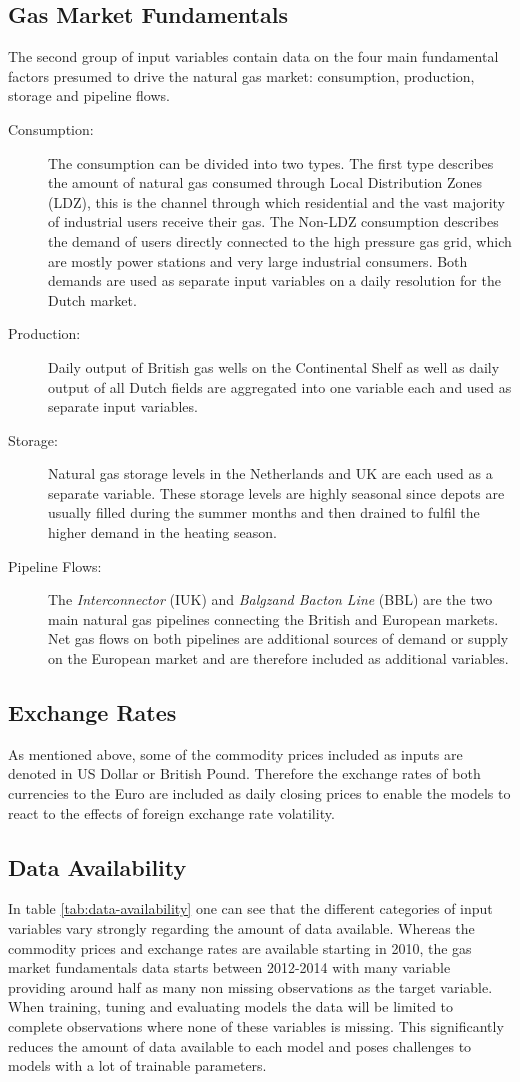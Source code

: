 \subsection{Gas Market Fundamentals}
The second group of input variables contain data on the four main fundamental factors presumed to drive the natural gas market: consumption, production, storage and pipeline flows. 
\begin{description}
\item[Consumption:] The consumption can be divided into two types. The first type describes the amount of natural gas consumed through Local Distribution Zones (LDZ), this is the channel through which residential and the vast majority of industrial users receive their gas. The Non-LDZ consumption describes the demand of users directly connected to the high pressure gas grid, which are mostly power stations and very large industrial consumers. Both demands are used as separate input variables on a daily resolution for the Dutch market.
\item[Production:] Daily output of British gas wells on the Continental Shelf as well as daily output of all Dutch fields are aggregated into one variable each and used as separate input variables.
\item[Storage:] Natural gas storage levels in the Netherlands and UK are each used as a separate variable. These storage levels are highly seasonal since depots are usually filled during the summer months and then drained to fulfil the higher demand in the heating season.
\item[Pipeline Flows:] The \textit{Interconnector} (IUK) and \textit{Balgzand Bacton Line} (BBL) are the two main natural gas pipelines connecting the British and European markets. Net gas flows on both pipelines are additional sources of demand or supply on the European market and are therefore included as additional variables.
\end{description}
\subsection{Exchange Rates}
As mentioned above, some of the commodity prices included as inputs are denoted in US Dollar or British Pound. Therefore the exchange rates of both currencies to the Euro are included as daily closing prices to enable the models to react to the effects of foreign exchange rate volatility.
\subsection{Data Availability}\label{Sec:Data-Availability}
In table \ref{tab:data-availability} one can see that the different categories of input variables vary strongly regarding the amount of data available. Whereas the commodity prices and exchange rates are available starting in 2010, the gas market fundamentals data starts between 2012-2014 with many variable providing around half as many non missing observations as the target variable. When training, tuning and evaluating models the data will be limited to complete observations where none of these variables is missing. This significantly reduces the amount of data available to each model and poses challenges to models with a lot of trainable parameters.

